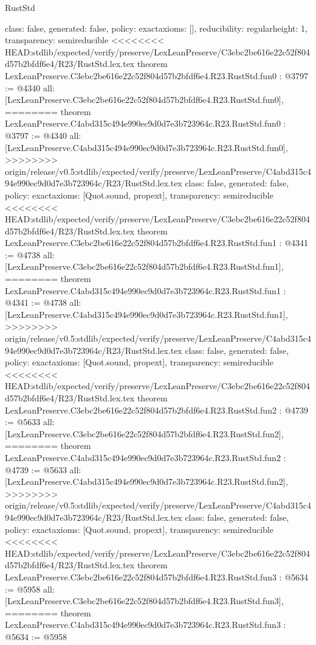 \begin{lexlean}{RustStd}
\begin{coremodule}
{\begin{coremodule}
{{{  class: false,
  generated: false,
  policy: exact{axioms: []},
  reducibility: regular{height: 1},
  transparency: semireducible
}
<<<<<<<< HEAD:stdlib/expected/verify/preserve/LexLeanPreserve/C3ebc2be616e22c52f804d57b2bfdf6e4/R23/RustStd.lex.tex
theorem LexLeanPreserve.C3ebc2be616e22c52f804d57b2bfdf6e4.R23.RustStd.fun0 : @3797 := @4340 {
  all: [LexLeanPreserve.C3ebc2be616e22c52f804d57b2bfdf6e4.R23.RustStd.fun0],
========
theorem LexLeanPreserve.C4abd315c494e990ec9d0d7e3b723964c.R23.RustStd.fun0 : @3797 := @4340 {
  all: [LexLeanPreserve.C4abd315c494e990ec9d0d7e3b723964c.R23.RustStd.fun0],
>>>>>>>> origin/release/v0.5:stdlib/expected/verify/preserve/LexLeanPreserve/C4abd315c494e990ec9d0d7e3b723964c/R23/RustStd.lex.tex
  class: false,
  generated: false,
  policy: exact{axioms: [Quot.sound, propext]},
  transparency: semireducible
}
<<<<<<<< HEAD:stdlib/expected/verify/preserve/LexLeanPreserve/C3ebc2be616e22c52f804d57b2bfdf6e4/R23/RustStd.lex.tex
theorem LexLeanPreserve.C3ebc2be616e22c52f804d57b2bfdf6e4.R23.RustStd.fun1 : @4341 := @4738 {
  all: [LexLeanPreserve.C3ebc2be616e22c52f804d57b2bfdf6e4.R23.RustStd.fun1],
========
theorem LexLeanPreserve.C4abd315c494e990ec9d0d7e3b723964c.R23.RustStd.fun1 : @4341 := @4738 {
  all: [LexLeanPreserve.C4abd315c494e990ec9d0d7e3b723964c.R23.RustStd.fun1],
>>>>>>>> origin/release/v0.5:stdlib/expected/verify/preserve/LexLeanPreserve/C4abd315c494e990ec9d0d7e3b723964c/R23/RustStd.lex.tex
  class: false,
  generated: false,
  policy: exact{axioms: [Quot.sound, propext]},
  transparency: semireducible
}
<<<<<<<< HEAD:stdlib/expected/verify/preserve/LexLeanPreserve/C3ebc2be616e22c52f804d57b2bfdf6e4/R23/RustStd.lex.tex
theorem LexLeanPreserve.C3ebc2be616e22c52f804d57b2bfdf6e4.R23.RustStd.fun2 : @4739 := @5633 {
  all: [LexLeanPreserve.C3ebc2be616e22c52f804d57b2bfdf6e4.R23.RustStd.fun2],
========
theorem LexLeanPreserve.C4abd315c494e990ec9d0d7e3b723964c.R23.RustStd.fun2 : @4739 := @5633 {
  all: [LexLeanPreserve.C4abd315c494e990ec9d0d7e3b723964c.R23.RustStd.fun2],
>>>>>>>> origin/release/v0.5:stdlib/expected/verify/preserve/LexLeanPreserve/C4abd315c494e990ec9d0d7e3b723964c/R23/RustStd.lex.tex
  class: false,
  generated: false,
  policy: exact{axioms: [Quot.sound, propext]},
  transparency: semireducible
}
<<<<<<<< HEAD:stdlib/expected/verify/preserve/LexLeanPreserve/C3ebc2be616e22c52f804d57b2bfdf6e4/R23/RustStd.lex.tex
theorem LexLeanPreserve.C3ebc2be616e22c52f804d57b2bfdf6e4.R23.RustStd.fun3 : @5634 := @5958 {
  all: [LexLeanPreserve.C3ebc2be616e22c52f804d57b2bfdf6e4.R23.RustStd.fun3],
========
theorem LexLeanPreserve.C4abd315c494e990ec9d0d7e3b723964c.R23.RustStd.fun3 : @5634 := @5958 {
}}}}}}}
\end{coremodule}}
\end{coremodule}
\end{lexlean}
